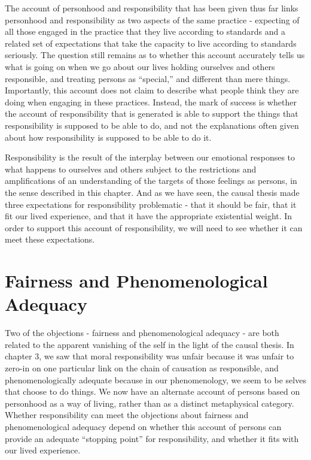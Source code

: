 \documentclass[phd,12pt,oneside,paper=letterpaper]{ubcthesis}
\begin{document}
The account of personhood and responsibility that has been given thus far links personhood and responsibility as two aspects of the same practice - expecting of all those engaged in the practice that they live according to standards and a related set of expectations that take the capacity to live according to standards seriously. The question still remains as to whether this account accurately tells us what is going on when we go about our lives holding ourselves and others responsible, and treating persons as ``special,'' and different than mere things. Importantly, this account does not claim to describe what people think they are doing when engaging in these practices. Instead, the mark of success is whether the account of responsibility that is generated is able to support the things that responsibility is supposed to be able to do, and not the explanations often given about how responsibility is supposed to be able to do it. 

Responsibility is the result of the interplay between our emotional responses to what happens to ourselves and others subject to the restrictions and amplifications of an understanding of the targets of those feelings as persons, in the sense described in this chapter. And as we have seen, the causal thesis made three expectations for responsibility problematic - that it should be fair, that it fit our lived experience, and that it have the appropriate existential weight. In order to support this account of responsibility, we will need to see whether it can meet these expectations. 

\section{Fairness and Phenomenological Adequacy }
Two of the objections - fairness and phenomenological adequacy - are both related to the apparent vanishing of the self in the light of the causal thesis. In chapter 3, we saw that moral responsibility was unfair because it was unfair to zero-in on one particular link on the chain of causation as responsible, and phenomenologically adequate because in our phenomenology, we seem to be selves that choose to do things. We now have an alternate account of persons based on personhood as a way of living, rather than as a distinct metaphysical category. Whether responsibility can meet the objections about fairness and phenomenological adequacy depend on whether this account of persons can provide an adequate ``stopping point'' for responsibility, and whether it fits with our lived experience. 
\end{document}
